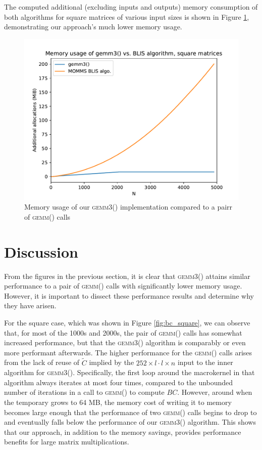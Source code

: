 \documentclass[12pt]{article}
\newcommand*{\gemmt}{{\textsc{gemm3()}}}
\newcommand*{\gemm}{{\textsc{gemm()}}}
\begin{document}
The computed additional (excluding inputs and outputs) memory consumption of both algorithms for square matrices of various input sizes is shown in Figure \ref{fig:bc_square_mem}, demonstrating our approach's much lower memory usage.
\begin{figure}
  \centering
  \includegraphics[height=0.40\textheight]{../results/earwig2/gemm3_memory}
  \caption{Memory usage of our \gemmt{} implementation compared to a pairr of \gemm{} calls}
  \label{fig:bc_square_mem}
\end{figure}

\section{Discussion}
From the figures in the previous section, it is clear that \gemmt{} attains similar performance to a pair of \gemm{} calls with significantly lower memory usage.
However, it is important to dissect these performance results and determine why they have arisen.

For the square case, which was shown in Figure \ref{fig:bc_square}, we can observe that, for most of the 1000s and 2000s, the pair of \gemm{} calls has somewhat increased performance, but that the \gemmt{} algorithm is comparably or even more performant afterwards.
The higher performance for the \gemm{} calls arises from the lack of reuse of $\tilde{C}$ implied by the $252 \times l \cdot l \times n$ input to the inner algorithm for \gemmt{}.
Specifically, the first loop around the macrokernel in that algorithm always iterates at most four times, compared to the unbounded number of iterations in a call to \gemm{} to compute $BC$.
However, around when the temporary grows to 64 MB, the memory cost of writing it to memory becomes large enough that the performance of two \gemm{} calls begins to drop to and eventually falls below the performance of our \gemmt{} algorithm.
This shows that our approach, in addition to the memory savings, provides performance benefits for large matrix multiplications.
\end{document}
